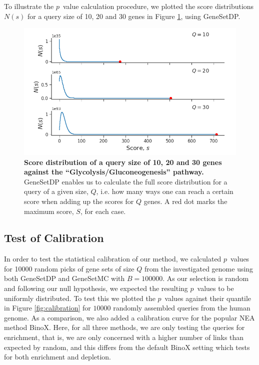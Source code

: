 \documentclass[a4paper,american]{lipics-v2016}
\begin{document}
To illustrate the $p$~value calculation procedure, we plotted the score distributions $N(s)$ for a query size of 10, 20 and 30 genes in Figure \ref{fig:score_dist}, using GeneSetDP.

\begin{figure}[htb]
	\begin{center}
		\includegraphics[width=1.0\textwidth]{figures/score_distribuition_multiple.png}
    \end{center}
  \caption{{\bf Score distribution of a query size of 10, 20 and 30 genes against the ``Glycolysis/Gluconeogenesis'' pathway.} GeneSetDP enables us to calculate the full score distribution for a query of a given size, $Q$, i.e. how many ways one can reach a certain score when adding up the scores for $Q$ genes. A red dot marks the maximum score, $S$, for each case.}
  \label{fig:score_dist}
\end{figure}

\subsection*{Test of Calibration}

In order to test the statistical calibration of our method, we calculated $p$~values for 10000 random picks of gene sets of size $Q$ from the investigated genome using both GeneSetDP and GeneSetMC with $B = 100000$. As our selection is random and following our null hypothesis, we expected the resulting $p$~values to be uniformly distributed. To test this we plotted the $p$~values against their quantile in Figure \ref{fig:calibration} for $10000$ randomly assembled queries from the human genome. As a comparison, we also added a calibration curve for the popular NEA method BinoX\cite{ogris2016novel}. Here, for all three methods, we are only testing the queries for enrichment, that is, we are only concerned with a higher number of links than expected by random, and this differs from the default BinoX setting which tests for both enrichment and depletion.
\end{document}

